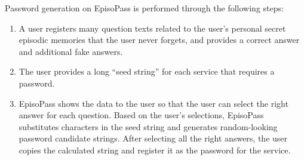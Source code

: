 \documentclass[runningheads,a4paper]{llncs}
\begin{document}
% 

Password generation on EpisoPass is performed through the following steps:

\begin{enumerate}
\item A user registers many question texts related to the user's personal
secret episodic memories that the user never forgets,
and provides a correct answer and additional fake answers.

\item The user provides a long ``seed string'' for each service that requires
a password.

\item EpisoPass shows the data to the user so that
the user can select the right answer for each question.
Based on the user's selections,
EpisoPass substitutes characters in the seed string and generates
random-looking password candidate strings.
After selecting all the right answers,
the user copies the calculated string
and register it as the password for the service.
\end{enumerate}
\end{document}
